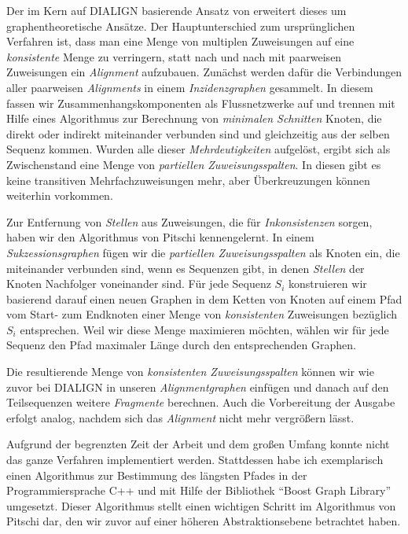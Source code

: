 Der im Kern auf DIALIGN basierende Ansatz von \cite{cpm10} erweitert dieses um graphentheoretische Ansätze. Der Hauptunterschied zum ursprünglichen Verfahren ist, dass man eine Menge von multiplen Zuweisungen auf eine \emph{konsistente} Menge zu verringern, statt nach und nach mit paarweisen Zuweisungen ein \emph{Alignment} aufzubauen. Zunächst werden dafür die Verbindungen aller paarweisen \emph{Alignments} in einem \emph{Inzidenzgraphen} gesammelt. In diesem fassen wir Zusammenhangskomponenten als Flussnetzwerke auf und trennen mit Hilfe eines Algorithmus zur Berechnung von \emph{minimalen Schnitten} Knoten, die direkt oder indirekt miteinander verbunden sind und gleichzeitig aus der selben Sequenz kommen. Wurden alle dieser \emph{Mehrdeutigkeiten} aufgelöst, ergibt sich als Zwischenstand eine Menge von \emph{partiellen Zuweisungsspalten}. In diesen gibt es keine transitiven Mehrfachzuweisungen mehr, aber Überkreuzungen können weiterhin vorkommen. 

Zur Entfernung von \emph{Stellen} aus Zuweisungen, die für \emph{Inkonsistenzen} sorgen, haben wir den Algorithmus von Pitschi kennengelernt. In einem \emph{Sukzessionsgraphen} fügen wir die \emph{partiellen Zuweisungsspalten} als Knoten ein, die miteinander verbunden sind, wenn es Sequenzen gibt, in denen \emph{Stellen} der Knoten Nachfolger voneinander sind. Für jede Sequenz $S_i$ konstruieren wir basierend darauf einen neuen Graphen in dem Ketten von Knoten auf einem Pfad vom Start- zum Endknoten einer Menge von \emph{konsistenten} Zuweisungen bezüglich $S_i$ entsprechen. Weil wir diese Menge maximieren möchten, wählen wir für jede Sequenz den Pfad maximaler Länge durch den entsprechenden Graphen.

Die resultierende Menge von \emph{konsistenten Zuweisungsspalten} können wir wie zuvor bei DIALIGN in unseren \emph{Alignmentgraphen} einfügen und danach auf den Teilsequenzen weitere \emph{Fragmente} berechnen. Auch die Vorbereitung der Ausgabe erfolgt analog, nachdem sich das \emph{Alignment} nicht mehr vergrößern lässt.

Aufgrund der begrenzten Zeit der Arbeit und dem großen Umfang konnte nicht das ganze Verfahren implementiert werden. Stattdessen habe ich exemplarisch einen Algorithmus zur Bestimmung des längsten Pfades in der Programmiersprache C++ und mit Hilfe der Bibliothek \enquote{Boost Graph Library} umgesetzt. Dieser Algorithmus stellt einen wichtigen Schritt im Algorithmus von Pitschi dar, den wir zuvor auf einer höheren Abstraktionsebene betrachtet haben. 

